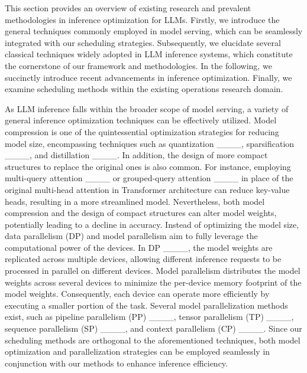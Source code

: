 This section provides an overview of existing research and prevalent methodologies in inference optimization for LLMs. Firstly, we introduce the general techniques commonly employed in model serving, which can be seamlessly integrated with our scheduling strategies. Subsequently, we elucidate several classical techniques widely adopted in LLM inference systems, which constitute the cornerstone of our framework and methodologies. In the following, we succinctly introduce recent advancements in inference optimization. Finally, we examine scheduling methods within the existing operations research domain.


As LLM inference falls within the broader scope of model serving, a variety of general inference optimization techniques can be effectively utilized. Model compression is one of the quintessential optimization strategies for reducing model size, encompassing techniques such as quantization ____, sparsification ____, and distillation ____. In addition, the design of more compact structures to replace the original ones is also common. For instance, employing multi-query attention ____ or grouped-query attention ____ in place of the original multi-head attention in Transformer architecture can reduce key-value heads, resulting in a more streamlined model. Nevertheless, both model compression and the design of compact structures can alter model weights, potentially leading to a decline in accuracy. Instead of optimizing the model size, data parallelism (DP) and model parallelism aim to fully leverage the computational power of the devices. In DP ____, the model weights are replicated across multiple devices, allowing different inference requests to be processed in parallel on different devices. Model parallelism distributes the model weights across several devices to minimize the per-device memory footprint of the model weights. Consequently, each device can operate more efficiently by executing a smaller portion of the task. Several model parallelization methods exist, such as pipeline parallelism (PP) ____, tensor parallelism (TP) ____, sequence parallelism (SP) ____, and context parallelism (CP) ____. Since our scheduling methods are orthogonal to the aforementioned techniques, both model optimization and parallelization strategies can be employed seamlessly in conjunction with our methods to enhance inference efficiency.


